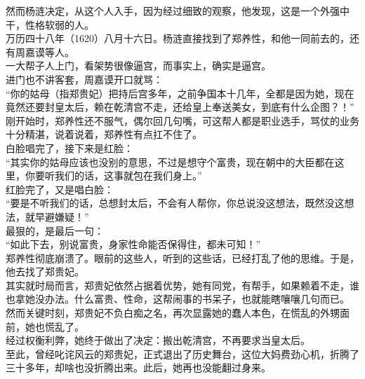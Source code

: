 \begin{multicols}{\theparacolNo}
然而杨涟决定，从这个人入手，因为经过细致的观察，他发现，这是一个外强中干，性格软弱的人。\\

万历四十八年（1620）八月十六日。杨涟直接找到了郑养性，和他一同前去的，还有周嘉谟等人。\\

一大帮子人上门，看架势很像逼宫，而事实上，确实是逼宫。\\

进门也不讲客套，周嘉谟开口就骂：\\

“你的姑母（指郑贵妃）把持后宫多年，之前争国本十几年，全都是因为她，现在竟然还要封皇太后，赖在乾清宫不走，还给皇上奉送美女，到底有什么企图？！”\\

刚开始时，郑养性还不服气，偶尔回几句嘴，可这帮人都是职业选手，骂仗的业务十分精湛，说着说着，郑养性有点扛不住了。\\

白脸唱完了，接下来是红脸：\\

“其实你的姑母应该也没别的意思，不过是想守个富贵，现在朝中的大臣都在这里，你要听我们的话，这事就包在我们身上。”\\

红脸完了，又是唱白脸：\\

“要是不听我们的话，总想封太后，不会有人帮你，你总说没这想法，既然没这想法，就早避嫌疑！”\\

最狠的，是最后一句：\\

“如此下去，别说富贵，身家性命能否保得住，都未可知！”\\

郑养性彻底崩溃了。眼前的这些人，听到的这些话，已经打乱了他的思维。于是，他去找了郑贵妃。\\

其实就时局而言，郑贵妃依然占据着优势，她有同党，有帮手，如果赖着不走，谁也拿她没办法。什么富贵、性命，这帮闹事的书呆子，也就能瞎嚷嚷几句而已。\\

然而关键时刻，郑贵妃不负白痴之名，再次显露她的蠢人本色，在慌乱的外甥面前，她也慌乱了。\\

经过权衡利弊，她终于做出了决定：搬出乾清宫，不再要求当皇太后。\\

至此，曾经叱诧风云的郑贵妃，正式退出了历史舞台，这位大妈费劲心机，折腾了三十多年，却啥也没折腾出来。此后，她再也没能翻过身来。\\


\end{multicols}

